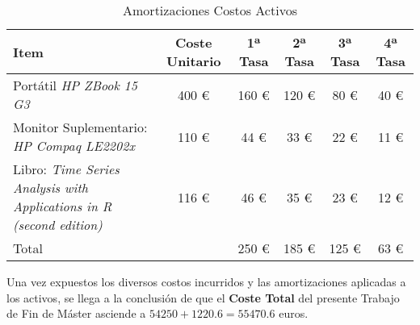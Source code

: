 \begin{table}[htbp]
    \centering
    \begin{tabular}{p{4cm}ccccc}
    \toprule
    Item & Coste Unitario & 1ª Tasa & 2ª Tasa & 3ª Tasa & 4ª Tasa \\
    \midrule
    Portátil \textit{HP ZBook 15 G3} & 400 € & 160 € & 120 € & 80 € & 40 € \\
    Monitor Suplementario: \textit{HP Compaq LE2202x} & 110 € & 44 € & 33 € & 22 € & 11 € \\
    Libro: \textit{Time Series Analysis with Applications in R (second edition)} & 116 € & 46 € & 35 € & 23 € & 12 € \\
    \midrule
    Total & & 250 € & 185 € & 125 € & 63 €  \\
    \bottomrule
    \end{tabular}
    \caption{Amortizaciones Costos Activos}\label{tab:costos-amortizados}
\end{table}

Una vez expuestos los diversos costos incurridos y las amortizaciones aplicadas a los activos, se llega a la conclusión de que el \textbf{Coste Total} del presente Trabajo de Fin de Máster asciende a $54250 + 1220.6 = 55470.6$ euros.

\newpage